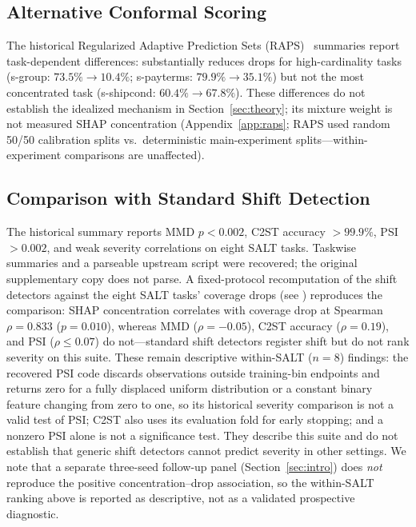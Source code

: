 \documentclass[accepted]{uai2026} %
\begin{document}
\subsection{Alternative Conformal Scoring}\label{sec:raps}

The historical Regularized Adaptive Prediction Sets (RAPS)~\citep{angelopoulos2021uncertainty} summaries report task-dependent differences: substantially reduces drops for high-cardinality tasks (s-group: $73.5\%\rightarrow10.4\%$; s-payterms: $79.9\%\rightarrow35.1\%$) but not the most concentrated task (s-shipcond: $60.4\%\rightarrow67.8\%$). These differences do not establish the idealized mechanism in Section~\ref{sec:theory}; its mixture weight is not measured SHAP concentration (Appendix~\ref{app:raps}; RAPS used random 50/50 calibration splits vs.\ deterministic main-experiment splits---within-experiment comparisons are unaffected).

\subsection{Comparison with Standard Shift Detection}\label{sec:shift_detection}

The historical summary reports MMD $p<0.002$, C2ST accuracy $>99.9\%$, PSI $>0.002$, and weak severity correlations on eight SALT tasks. Taskwise summaries and a parseable upstream script were recovered; the original supplementary copy does not parse. A fixed-protocol recomputation of the shift detectors against the eight SALT tasks' coverage drops (see ) reproduces the comparison: SHAP concentration correlates with coverage drop at Spearman $\rho=0.833$ ($p=0.010$), whereas MMD ($\rho=-0.05$), C2ST accuracy ($\rho=0.19$), and PSI ($\rho\le0.07$) do not---standard shift detectors register shift but do not rank severity on this suite. These remain descriptive within-SALT ($n=8$) findings: the recovered PSI code discards observations outside training-bin endpoints and returns zero for a fully displaced uniform distribution or a constant binary feature changing from zero to one, so its historical severity comparison is not a valid test of PSI; C2ST also uses its evaluation fold for early stopping; and a nonzero PSI alone is not a significance test. They describe this suite and do not establish that generic shift detectors cannot predict severity in other settings. We note that a separate three-seed follow-up panel (Section~\ref{sec:intro}) does \emph{not} reproduce the positive concentration--drop association, so the within-SALT ranking above is reported as descriptive, not as a validated prospective diagnostic.
\end{document}
